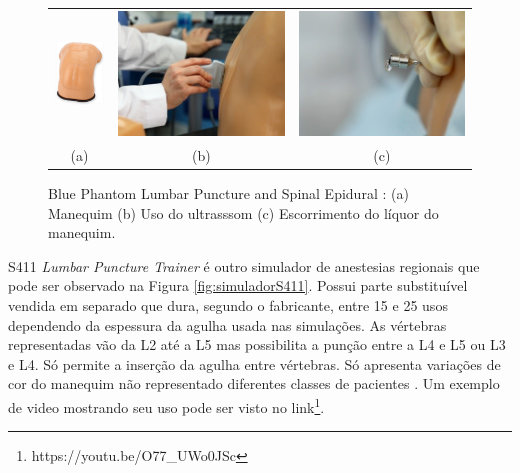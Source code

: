 \begin{figure}[ht!]
    \centering
        \begin{tabular}{ccc}
        \includegraphics[width=0.17\linewidth]{capitulos/figuras/BluePhatom-manequim.png} & 
        \includegraphics[width=0.3\linewidth]{capitulos/figuras/BluePhatom-ultrassom.jpg} 
        &
        \includegraphics[width=0.3\linewidth]{capitulos/figuras/BluePhatom-escorrimentoLiquor.jpg} 
        \\
        (a) & (b) & (c)
        \end{tabular}
    \caption{Blue Phantom Lumbar Puncture and Spinal Epidural \cite{BluePhantom2011}: (a) Manequim (b) Uso do ultrasssom (c) Escorrimento do líquor do manequim.}
    \label{fig:bluePhantom}
\end{figure}

S411 \textit{Lumbar Puncture Trainer} é outro simulador de anestesias regionais que pode ser observado na Figura \ref{fig:simuladorS411}. Possui parte substituível vendida em separado que dura, segundo o fabricante, entre 15 e 25 usos dependendo da espessura da agulha usada nas simulações. As vértebras representadas vão da L2 até a L5 mas possibilita a punção entre a L4 e L5 ou L3 e L4. Só permite a inserção da agulha entre vértebras. Só apresenta variações de cor do manequim não representado diferentes classes de pacientes \cite{GaumardScientific}. Um exemplo de video mostrando seu uso pode ser visto no link\footnote{https://youtu.be/O77_UWo0JSc}.

